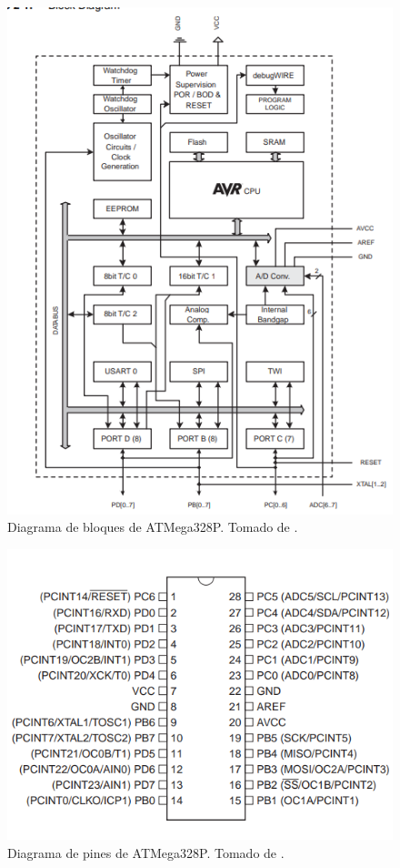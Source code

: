 \begin{figure}[H]
\centering
\includegraphics[width=.8\linewidth]{Imagenes/1.png}
 \caption{Diagrama de bloques de ATMega328P. Tomado de \cite{web}.}
 \label{fig1}
\end{figure}

\begin{figure}[H]
\centering
\includegraphics[width=.8\linewidth]{Imagenes/2.png}
 \caption{Diagrama de pines de ATMega328P. Tomado de \cite{web}.}
 \label{fig2}
\end{figure}
